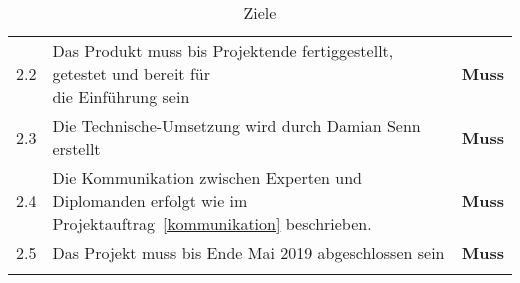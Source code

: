 \begin{longtable}[]{@{}llc@{}}
  2.2  & \makecell[l]{Das Produkt muss bis Projektende fertiggestellt, getestet und                                            bereit für                                \\ die Einführung sein}     & \textbf{Muss}\tabularnewline
  2.3  & Die Technische-Umsetzung wird durch Damian Senn erstellt                                                                         & \textbf{Muss}\tabularnewline
  2.4  & \makecell[l]{Die Kommunikation zwischen Experten und Diplomanden erfolgt wie im                                                                                 \\ Projektauftrag~\ref{kommunikation} beschrieben.} & \textbf{Muss}\tabularnewline
  2.5  & Das Projekt muss bis Ende Mai 2019 abgeschlossen sein                                                                            & \textbf{Muss}\tabularnewline
  \bottomrule
  \caption{Ziele}
\end{longtable}
